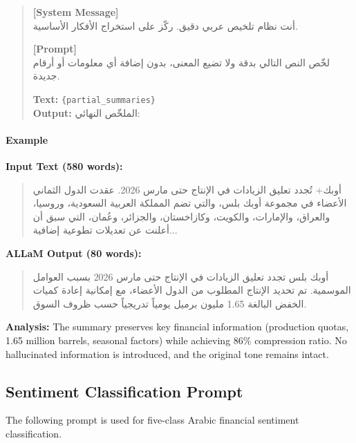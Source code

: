 \documentclass[10pt,a4paper]{article}
\begin{document}
\begin{quote}
\small
\textbf{[System Message]}\\
\textarabic{أنت نظام تلخيص عربي دقيق. ركّز على استخراج الأفكار الأساسية.}

\vspace{0.5em}
\textbf{[Prompt]}\\
\textarabic{لخّص النص التالي بدقة ولا تضيع المعنى، بدون إضافة أي معلومات أو أرقام جديدة.}

\vspace{0.5em}
\textbf{Text:} \texttt{\{partial\_summaries\}}\\
\textbf{Output:} \textarabic{الملخّص النهائي:}
\end{quote}

\paragraph{Example}

\textbf{Input Text (580 words):}
\begin{quote}
\small
\textarabic{أوبك+ تُجدد تعليق الزيادات في الإنتاج حتى مارس 2026. عقدت الدول الثماني الأعضاء في مجموعة أوبك بلس، والتي تضم المملكة العربية السعودية، وروسيا، والعراق، والإمارات، والكويت، وكازاخستان، والجزائر، وعُمان، التي سبق أن أعلنت عن تعديلات تطوعية إضافية...}
\end{quote}

\textbf{ALLaM Output (80 words):}
\begin{quote}
\small
\textarabic{أوبك بلس تجدد تعليق الزيادات في الإنتاج حتى مارس 2026 بسبب العوامل الموسمية. تم تحديد الإنتاج المطلوب من الدول الأعضاء، مع إمكانية إعادة كميات الخفض البالغة 1.65 مليون برميل يومياً تدريجياً حسب ظروف السوق.}
\end{quote}

\textbf{Analysis:}
The summary preserves key financial information (production quotas, 1.65 million barrels, seasonal factors) while achieving 86\% compression ratio. No hallucinated information is introduced, and the original tone remains intact.

\subsection{Sentiment Classification Prompt}

The following prompt is used for five-class Arabic financial sentiment classification.
\end{document}

